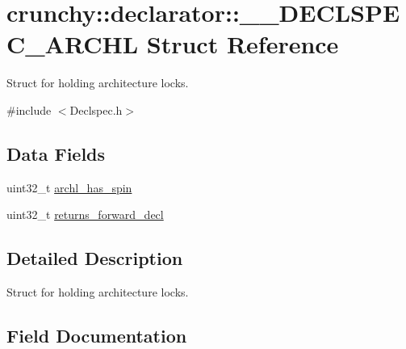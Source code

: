 \hypertarget{structcrunchy_1_1declarator_1_1_____d_e_c_l_s_p_e_c___a_r_c_h_l}{}\section{crunchy\+:\+:declarator\+:\+:\+\_\+\+\_\+\+D\+E\+C\+L\+S\+P\+E\+C\+\_\+\+A\+R\+C\+H\+L Struct Reference}
\label{structcrunchy_1_1declarator_1_1_____d_e_c_l_s_p_e_c___a_r_c_h_l}


Struct for holding architecture locks.  




{\ttfamily \#include $<$Declspec.\+h$>$}

\subsection*{Data Fields}
\begin{DoxyCompactItemize}
\item 
uint32\+\_\+t \hyperlink{structcrunchy_1_1declarator_1_1_____d_e_c_l_s_p_e_c___a_r_c_h_l_aadc3174237edfc7511f0b8bd94fde0ba}{archl\+\_\+has\+\_\+spin}
\item 
uint32\+\_\+t \hyperlink{structcrunchy_1_1declarator_1_1_____d_e_c_l_s_p_e_c___a_r_c_h_l_a73a2d868629fed82ad40089b1a7066d4}{returns\+\_\+forward\+\_\+decl}
\end{DoxyCompactItemize}


\subsection{Detailed Description}
Struct for holding architecture locks. 

\subsection{Field Documentation}
\hypertarget{structcrunchy_1_1declarator_1_1_____d_e_c_l_s_p_e_c___a_r_c_h_l_aadc3174237edfc7511f0b8bd94fde0ba}{}
